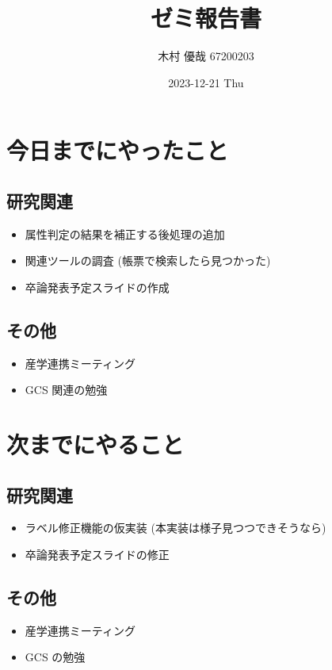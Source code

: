 \documentclass[uplatex, onecolumn, 10pt]{jsarticle}
\begin{document}
\title{\vspace{-40mm}\bf{\LARGE{ゼミ報告書}}}
\author{\vspace{-40mm}木村 優哉 67200203}
\date{2023-12-21 Thu}
\maketitle


\section{今日までにやったこと}

\subsection*{研究関連}
\begin{itemize}
	\item 属性判定の結果を補正する後処理の追加
	\item 関連ツールの調査 (帳票で検索したら見つかった)
	\item 卒論発表予定スライドの作成
\end{itemize}

\subsection*{その他}
\begin{itemize}
	\item 産学連携ミーティング
	\item GCS 関連の勉強
\end{itemize}


\section{次までにやること}

\subsection*{研究関連}
\begin{itemize}
	\item ラベル修正機能の仮実装 (本実装は様子見つつできそうなら)
	\item 卒論発表予定スライドの修正
\end{itemize}

\subsection*{その他}
\begin{itemize}
	\item 産学連携ミーティング
	\item GCS の勉強
\end{itemize}
\end{document}
